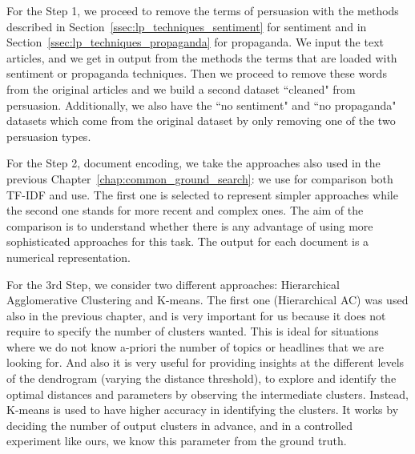For the Step 1, we proceed to remove the terms of persuasion with the methods described in Section~\ref{ssec:lp_techniques_sentiment} for sentiment and in Section~\ref{ssec:lp_techniques_propaganda} for propaganda. We input the text articles, and we get in output from the methods the terms that are loaded with sentiment or propaganda techniques. Then we proceed to remove these words from the original articles and we build a second dataset ``cleaned" from persuasion.
Additionally, we also have the ``no sentiment" and ``no propaganda" datasets which come from the original dataset by only removing one of the two persuasion types.

For the Step 2, document encoding, we take the approaches 
also used in the previous Chapter~\ref{chap:common_ground_search}: we use for comparison both TF-IDF and \acrshort{use}. The first one is selected to represent simpler approaches while the second one stands for more recent and complex ones. The aim of the comparison is to understand whether there is any advantage of using more sophisticated approaches for this task.
The output for each document is a numerical representation.

For the 3rd Step, we consider two different approaches: Hierarchical Agglomerative Clustering and K-means. The first one (Hierarchical AC) was used also in the previous chapter, and is very important for us because it does not require to specify the number of clusters wanted. This is ideal for situations where we do not know a-priori the number of topics or headlines that we are looking for. And also it is very useful for providing insights at the different levels of the dendrogram (varying the distance threshold), to explore and identify the optimal distances and parameters by observing the intermediate clusters.
Instead, K-means is used to have higher accuracy in identifying the clusters. It works by deciding the number of output clusters in advance, and in a controlled experiment like ours, we know this parameter from the ground truth. %


